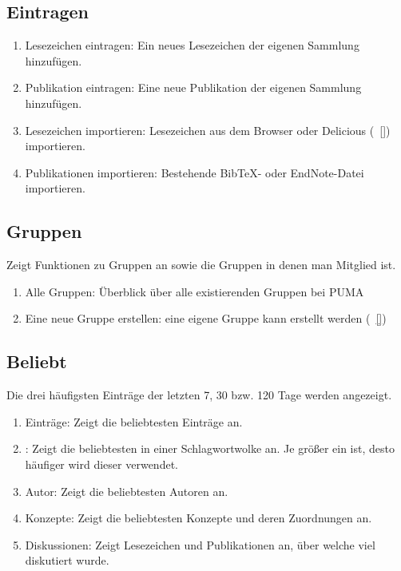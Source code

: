 \subsection{Eintragen}
\label{subsec:eintragen}
\begin{enumerate}
    \item Lesezeichen eintragen: Ein neues Lesezeichen der eigenen Sammlung hinzufügen.  
    \item Publikation eintragen: Eine neue Publikation der eigenen Sammlung hinzufügen. 
    \item Lesezeichen importieren: Lesezeichen aus dem Browser oder Delicious (~\autoref{}) importieren.
    \item Publikationen importieren: Bestehende BibTeX- oder EndNote-Datei importieren.
\end{enumerate}

\subsection{Gruppen}
\label{subsec:gruppen}
Zeigt Funktionen zu Gruppen an sowie die Gruppen in denen man Mitglied ist.
\begin{enumerate}
    \item Alle Gruppen: Überblick über alle existierenden Gruppen bei PUMA
    \item Eine neue Gruppe erstellen: eine eigene Gruppe kann erstellt werden (~\autoref{})
\end{enumerate}
\subsection{Beliebt}
\label{subsec:beliebt}
Die drei häufigsten Einträge der letzten 7, 30 bzw. 120 Tage werden angezeigt.
\begin{enumerate}
    \item Einträge: Zeigt die beliebtesten Einträge an.
    \item \tags: Zeigt die beliebtesten \tags in einer Schlagwortwolke an. Je größer ein \tag ist, desto häufiger wird dieser verwendet.
    \item Autor: Zeigt die beliebtesten Autoren an.
    \item Konzepte: Zeigt die beliebtesten Konzepte und deren Zuordnungen an. 
    \item Diskussionen: Zeigt Lesezeichen und Publikationen an, über welche viel diskutiert wurde. 
\end{enumerate}
